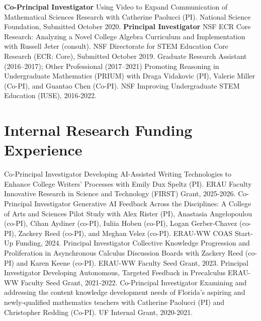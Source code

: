\documentclass[10pt,a4paper,sans]{moderncv}
\begin{document}
	{}{}
	{\textbf{Co-Principal Investigator}}
	{Using Video to Expand Communication of Mathematical Sciences Research}
	{with Catherine Paolucci (PI). National Science Foundation, Submitted October 2020.}
	{}{}
	{\textbf{Principal Investigator}}
	{NSF ECR Core Research: Analyzing a Novel College Algebra Curriculum and Implementation}
	{with Russell Jeter (consult). NSF Directorate for STEM Education Core Research (ECR: Core), Submitted October 2019.}
	{}{}
	{Graduate Research Assistant (2016--2017); Other Professional (2017--2021)}
	{Promoting Reasoning in Undergraduate Mathematics (PRIUM)}
	{with Draga Vidakovic (PI), Valerie Miller (Co-PI), and Guantao Chen (Co-PI). NSF Improving Undergraduate STEM Education (IUSE), 2016-2022.}
	{}{}
	
	\section{Internal Research Funding Experience}
	{Co-Principal Investigator}
	{Developing AI-Assisted Writing Technologies to Enhance College Writers’ Processes}
	{with Emily Dux Speltz (PI). 
		ERAU Faculty Innovative Research in Science and Technology (FIRST) Grant, 2025-2026.}
	{}{}
	{Co-Principal Investigator}
	{Generative AI Feedback Across the Disciplines: A College of Arts and Sciences Pilot Study}
	{with Alex Rister (PI), Anastasia Angelopoulou (co-PI), Cihan Aydiner (co-PI), Iuliia Hoben (co-PI), Logan Gerber-Chavez (co-PI), Zackery Reed (co-PI), and Meghan Velez (co-PI). 
		ERAU-WW COAS Start-Up Funding, 2024.}
	{}{}
	{Principal Investigator}
	{Collective Knowledge Progression and Proliferation in Asynchronous Calculus Discussion Boards}
	{with Zackery Reed (co-PI) and Karen Keene (co-PI). 
		ERAU-WW Faculty Seed Grant, 2023.}
	{}{}
	{Principal Investigator}
	{Developing Autonomous, Targeted Feedback in Precalculus}
	{ERAU-WW Faculty Seed Grant, 2021-2022.}
	{}{}
	{Co-Principal Investigator}
	{Examining and addressing the content knowledge development needs of Florida's aspiring and newly-qualified mathematics teachers}
	{with Catherine Paolucci (PI) and Christopher Redding (Co-PI). 
		UF Internal Grant, 2020-2021.}
	{}{}
	
\end{document}
